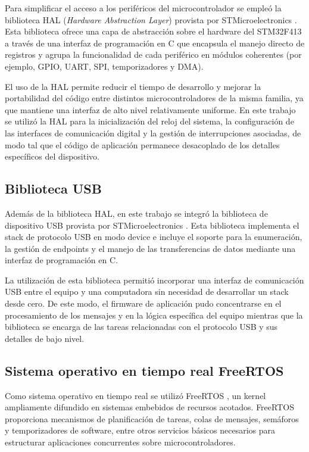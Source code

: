 Para simplificar el acceso a los periféricos del microcontrolador se empleó la biblioteca HAL (\textit{Hardware Abstraction Layer}) provista por STMicroelectronics \cite{st:um1725}. Esta biblioteca ofrece una capa de abstracción sobre el hardware del STM32F413 a través de una interfaz de programación en C que encapsula el manejo directo de registros y agrupa la funcionalidad de cada periférico en módulos coherentes (por ejemplo, GPIO, UART, SPI, temporizadores y DMA).

El uso de la HAL permite reducir el tiempo de desarrollo y mejorar la portabilidad del código entre distintos microcontroladores de la misma familia, ya que mantiene una interfaz de alto nivel relativamente uniforme. En este trabajo se utilizó la HAL para la inicialización del reloj del sistema, la configuración de las interfaces de comunicación digital y la gestión de interrupciones asociadas, de modo tal que el código de aplicación permanece desacoplado de los detalles específicos del dispositivo.

\subsection{Biblioteca USB}

Además de la biblioteca HAL, en este trabajo se integró la biblioteca de dispositivo USB provista por STMicroelectronics \cite{st:um1734}. Esta biblioteca implementa el stack de protocolo USB en modo device e incluye el soporte para la enumeración, la gestión de endpoints y el manejo de las transferencias de datos mediante una interfaz de programación en C.

La utilización de esta biblioteca permitió incorporar una interfaz de comunicación USB entre el equipo y una computadora sin necesidad de desarrollar un stack desde cero. De este modo, el firmware de aplicación pudo concentrarse en el procesamiento de los mensajes y en la lógica específica del equipo mientras que la biblioteca se encarga de las tareas relacionadas con el protocolo USB y sus detalles de bajo nivel.

\subsection{Sistema operativo en tiempo real FreeRTOS}

Como sistema operativo en tiempo real se utilizó FreeRTOS \cite{freertos:kernel}, un kernel ampliamente difundido en sistemas embebidos de recursos acotados. FreeRTOS proporciona mecanismos de planificación de tareas, colas de mensajes, semáforos y temporizadores de software, entre otros servicios básicos necesarios para estructurar aplicaciones concurrentes sobre microcontroladores.


